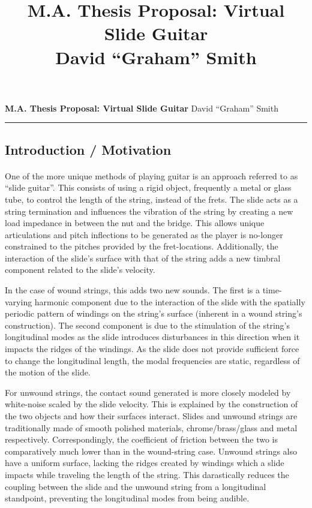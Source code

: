 \documentclass[12pt]{article}
\title{M.A. Thesis Proposal: Virtual Slide Guitar \\David ``Graham'' Smith}
\begin{document}

\begin{flushleft}
    \large \textbf{M.A. Thesis Proposal: Virtual Slide Guitar}
    \hfill
    \normalsize David ``Graham'' Smith
\end{flushleft}
\hrule

\subsection*{Introduction / Motivation}
\paragraph{}
One of the more unique methods of playing guitar is an approach referred to as “slide guitar”. This consists of using a rigid object, frequently a metal or glass tube, to control the length of the string, instead of the frets. The slide acts as a string termination and influences the vibration of the string by creating a new load impedance in between the nut and the bridge. This allows unique articulations and pitch inflections to be generated as the player is no-longer constrained to the pitches provided by the fret-locations. Additionally, the interaction of the slide’s surface with that of the string adds a new timbral component related to the slide’s velocity. 

In the case of wound strings, this adds two new sounds. The first is a time-varying harmonic component due to the interaction of the slide with the spatially periodic pattern of windings on the string’s surface (inherent in a wound string’s construction).  The second component is due to the stimulation of the string’s longitudinal modes as the slide introduces disturbances in this direction when it impacts the ridges of the windings. As the slide does not provide sufficient force to change the longitudinal length, the modal frequencies are static, regardless of the motion of the slide. 

For unwound strings, the contact sound generated is more closely modeled by white-noise scaled by the slide velocity. This is explained by the construction of the two objects and how their surfaces interact. Slides and unwound strings are traditionally made of smooth polished materials, chrome/brass/glass and metal respectively. Correspondingly, the coefficient of friction between the two is comparatively much lower than in the wound-string case. Unwound strings also have a uniform surface, lacking the ridges created by windings which a slide impacts while traveling the length of the string. This darastically reduces the coupling between the slide and the unwound string from a longitudinal standpoint, preventing the longitudinal modes from being audible.
\end{document}

